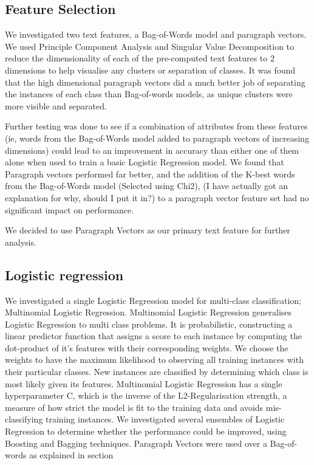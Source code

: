 \documentclass[11pt]{article}
\newcommand{\drafting}[1]{\textcolor{OliveGreen}{#1}}
\begin{document}
\subsection{Feature Selection} \label{subsec:method-features}

We investigated two text features, a Bag-of-Words model and paragraph vectors. We used Principle Component Analysis and Singular Value Decomposition to reduce the dimensionality of each of the pre-computed text features to 2 dimensions to help visualise any clusters or separation of classes. It was found that the high dimensional paragraph vectors did a much better job of separating the instances of each class than Bag-of-words models, as unique clusters were more visible and separated.

Further testing was done to see if a combination of attributes from these features (ie, words from the Bag-of-Words model added to paragraph vectors of increasing dimensions) could lead to an improvement in accuracy than either one of them alone when used to train a basic Logistic Regression model. We found that Paragraph vectors performed far better, and the addition of the K-best words from the Bag-of-Words model (Selected using Chi2), \drafting{(I have actually got an explanation for why, should I put it in?)} to a paragraph vector feature set had no significant impact on performance.

We decided to use Paragraph Vectors as our primary text feature for further analysis.
\subsection{Logistic regression} \label{subsec:method-lr}
\drafting{
We investigated a single Logistic Regression model for multi-class classification; Multinomial Logistic Regression. Multinomial Logistic Regression generalises Logistic Regression to multi class problems. It is probabilistic, constructing a linear predictor function that assigns a score to each instance by computing the dot-product of it's features with their corresponding weights. We choose the weights to have the maximum likelihood to observing all training instances with their particular classes. New instances are classified by determining which class is most likely given its features.
Multinomial Logistic Regression has a single hyperparameter C, which is the inverse of the L2-Regularisation strength, a measure of how strict the model is fit to the training data and avoids mis-classifying training instances.
We investigated several ensembles of Logistic Regression to determine whether the performance could be improved, using Boosting and Bagging techniques.
Paragraph Vectors were used over a Bag-of-words as explained in section}
\end{document}
